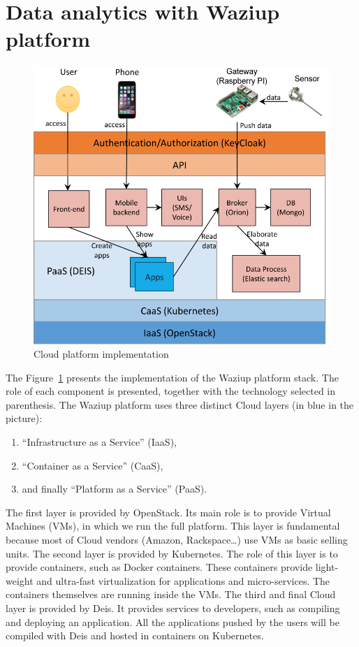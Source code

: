 
\section{Data analytics with Waziup platform}

\begin{figure}[htb]  
\centering  
\includegraphics[width=.6\linewidth]{figures/implem}   
\caption{Cloud platform implementation}
\label{fig-implem}  
\end{figure} 

The Figure~\ref{fig-implem} presents the implementation of the Waziup platform stack.
The role of each component is presented, together with the technology selected in parenthesis.
The Waziup platform uses three distinct Cloud layers (in blue in the picture):
\begin{enumerate}
  \item “Infrastructure as a Service” (IaaS),    
  \item “Container as a Service” (CaaS),    
  \item and finally “Platform as a Service” (PaaS).     
\end{enumerate}

The first layer is provided by OpenStack.
Its main role is to provide Virtual Machines (VMs), in which we run the full platform.
This layer is fundamental because most of Cloud vendors (Amazon, Rackspace…) use VMs as basic selling units.
The second layer is provided by Kubernetes.
The role of this layer is to provide containers, such as Docker containers.
These containers provide light-weight and ultra-fast virtualization for applications and micro-services.
The containers themselves are running inside the VMs.
The third and final Cloud layer is provided by Deis.
It provides services to developers, such as compiling and deploying an application.
All the applications pushed by the users will be compiled with Deis and hosted in containers on Kubernetes.

